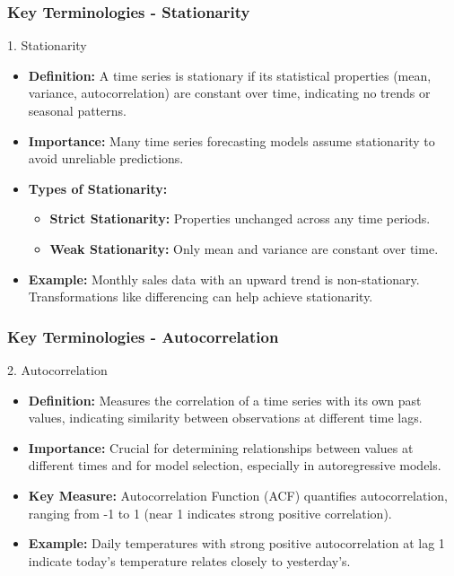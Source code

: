 \documentclass[aspectratio=169]{beamer}
\begin{document}
\begin{frame}[fragile]
    \frametitle{Key Terminologies - Stationarity}
    \begin{block}{1. Stationarity}
        \begin{itemize}
            \item \textbf{Definition:} A time series is stationary if its statistical properties (mean, variance, autocorrelation) are constant over time, indicating no trends or seasonal patterns.
            \item \textbf{Importance:} Many time series forecasting models assume stationarity to avoid unreliable predictions.
            \item \textbf{Types of Stationarity:}
                \begin{itemize}
                    \item \textbf{Strict Stationarity:} Properties unchanged across any time periods.
                    \item \textbf{Weak Stationarity:} Only mean and variance are constant over time.
                \end{itemize}
            \item \textbf{Example:} Monthly sales data with an upward trend is non-stationary. Transformations like differencing can help achieve stationarity.
        \end{itemize}
    \end{block}
\end{frame}

\begin{frame}[fragile]
    \frametitle{Key Terminologies - Autocorrelation}
    \begin{block}{2. Autocorrelation}
        \begin{itemize}
            \item \textbf{Definition:} Measures the correlation of a time series with its own past values, indicating similarity between observations at different time lags.
            \item \textbf{Importance:} Crucial for determining relationships between values at different times and for model selection, especially in autoregressive models.
            \item \textbf{Key Measure:} Autocorrelation Function (ACF) quantifies autocorrelation, ranging from -1 to 1 (near 1 indicates strong positive correlation).
            \item \textbf{Example:} Daily temperatures with strong positive autocorrelation at lag 1 indicate today's temperature relates closely to yesterday's.
        \end{itemize}
    \end{block}
\end{frame}
\end{document}
